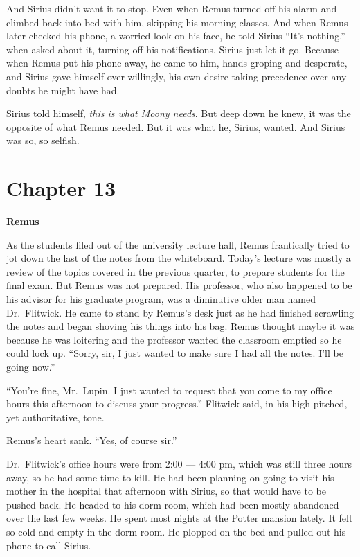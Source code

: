 \documentclass[12pt,twoside,openright]{memoir}
\begin{document}
And Sirius didn't want it to stop. Even when Remus turned off his alarm and climbed back into bed with him, skipping his morning classes. And when Remus later checked his phone, a worried look on his face, he told Sirius ``It's nothing.''
when asked about it, turning off his notifications. Sirius just let it go. Because when Remus put his phone away, he came to him, hands groping and desperate, and Sirius gave himself over willingly, his own desire taking precedence over any doubts he might have had.

Sirius told himself, \textit{this is what Moony needs}. But deep down he knew, it was the opposite of what Remus needed. But it was what he, Sirius, wanted. And Sirius was so, so selfish.

\chapter*{Chapter 13}

\textbf{Remus} 

As the students filed out of the university lecture hall, Remus frantically tried to jot down the last of the notes from the whiteboard. Today's lecture was mostly a review of the topics covered in the previous quarter, to prepare students for the final exam. But Remus was not prepared. His professor, who also happened to be his advisor for his graduate program, was a diminutive older man named Dr.\ Flitwick. He came to stand by Remus's desk just as he had finished scrawling the notes and began shoving his things into his bag. Remus thought maybe it was because he was loitering and the professor wanted the classroom emptied so he could lock up. ``Sorry, sir, I just wanted to make sure I had all the notes. I'll be going now.''

``You're fine, Mr.\ Lupin. I just wanted to request that you come to my office hours this afternoon to discuss your progress.'' Flitwick said, in his high pitched, yet authoritative, tone. 

Remus's heart sank. ``Yes, of course sir.''

Dr.\ Flitwick's office hours were from 2:00 --- 4:00 pm, which was still three hours away, so he had some time to kill. He had been planning on going to visit his mother in the hospital that afternoon with Sirius, so that would have to be pushed back. He headed to his dorm room, which had been mostly abandoned over the last few weeks. He spent most nights at the Potter mansion lately. It felt so cold and empty in the dorm room. He plopped on the bed and pulled out his phone to call Sirius.
\end{document}
